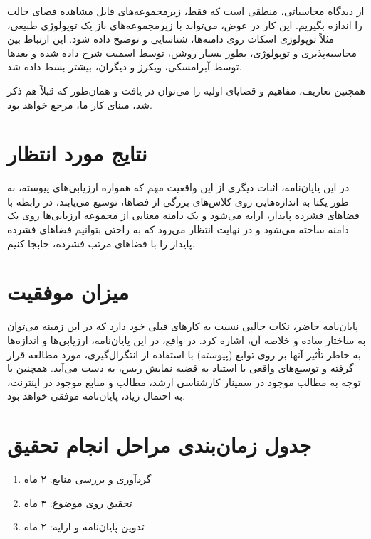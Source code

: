 \documentclass[12pt,a4paper]{article}
\theoremstyle{definition}
\theoremstyle{theorem}
\theoremstyle{definition}
\begin{document}
از دیدگاه محاسباتی، منطقی است که فقط، زیرمجموعه‌های قابل ‌مشاهده فضای حالت را اندازه بگیریم. این کار در عوض، می‌تواند با زیرمجموعه‌های باز یک توپولوژی طبیعی، مثلاً توپولوژی اسکات روی دامنه‌ها، شناسایی و توضیح داده شود. این ارتباط بین محاسبه‌پذیری و توپولوژی، بطور بسیار روشن، توسط اسمیت\cite{smyth1,smyth2}  شرح داده شده و  بعدها توسط آبرامسکی\cite{abramsky1}، ویکرز\cite{vickers} و دیگران، بیشتر بسط داده شد.

همچنین تعاریف، مفاهیم و قضایای اولیه را می‌توان در 
\cite{abramsky2}
یافت و همان‌طور که قبلاً هم ذکر شد، مبنای کار ما، مرجع 
\cite{alvarez}
خواهد بود.

\section{نتایج مورد انتظار}



در این پایان‌نامه، اثبات دیگری از این واقعیت مهم که همواره ارزیابی‌های پیوسته، به طور یکتا به اندازه‌هایی روی کلاس‌های بزرگی از فضاها، توسیع می‌یابند، در رابطه با فضاهای فشرده پایدار، ارایه می‌‌شود و یک دامنه معنایی از مجموعه ارزیابی‌ها روی یک دامنه ساخته می‌شود و در نهایت انتظار می‌رود که به راحتی بتوانیم  فضاهای فشرده پایدار را با  فضاهای مرتب فشرده، جابجا کنیم. 
\section{ میزان موفقیت }
پایان‌نامه حاضر، نکات جالبی نسبت به کارهای قبلی خود دارد که در این زمینه می‌توان به ساختار ساده و خلاصه آن، اشاره کرد. در واقع، در این پایان‌نامه، ارزیابی‌ها و اندازه‌ها به خاطر تأثیر آنها بر روی توابع (پیوسته) با استفاده از انتگرال‌گیری، مورد مطالعه قرار گرفته  و توسیع‌های واقعی با استناد به قضیه نمایش ریس، به دست می‌آید. همچنین با توجه به مطالب موجود در سمینار کارشناسی ارشد، مطالب و منابع موجود در اینترنت، به  احتمال زیاد، پایان‌نامه موفقی خواهد بود.
\section{ جدول زمان‌بندی مراحل انجام تحقیق }
\begin{enumerate}
\item  
گردآوری و بررسی منابع: ۲ ماه  
\item  
تحقیق روی موضوع: ۳ ماه  
\item  
تدوین پایان‌نامه و ارایه: ۲ ماه  
\end{enumerate}
\end{document}
